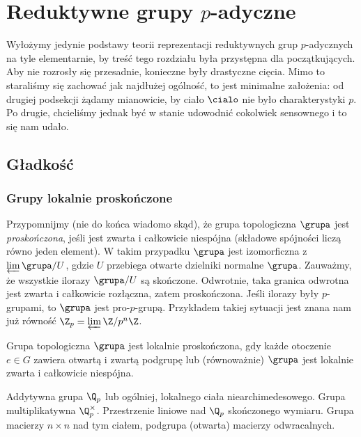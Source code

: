 \section{Reduktywne grupy $p$-adyczne}
Wyłożymy jedynie podstawy teorii reprezentacji reduktywnych grup $p$-adycznych na tyle elementarnie, by treść tego rozdziału była przystępna dla początkujących.
Aby nie rozrosły się przesadnie, konieczne były drastyczne cięcia.
Mimo to staraliśmy się zachować jak najdłużej ogólność, to jest minimalne założenia: od drugiej podsekcji żądamy mianowicie, by ciało $\cialo$ nie było charakterystyki $p$.
Po drugie, chcieliśmy jednak być w stanie udowodnić cokolwiek sensownego i to się nam udało.

\subsection{Gładkość}
\subsubsection{Grupy lokalnie proskończone}
Przypomnijmy (nie do końca wiadomo skąd), że grupa topologiczna $\grupa$ jest \emph{proskończona}, jeśli jest zwarta i całkowicie niespójna (składowe spójności liczą równo jeden element).
W takim przypadku $\grupa$ jest izomorficzna z $\varprojlim \grupa / U$, gdzie $U$ przebiega otwarte dzielniki normalne $\grupa$.
Zauważmy, że wszystkie ilorazy $\grupa / U$ są skończone.
Odwrotnie, taka granica odwrotna jest zwarta i całkowicie rozłączna, zatem proskończona.
Jeśli ilorazy były $p$-grupami, to $\grupa$ jest pro-$p$-grupą.
Przykładem takiej sytuacji jest znana nam już równość $\Z_p = \varprojlim \Z/p^n\Z$.

\begin{definicja}
	Grupa topologiczna $\grupa$ jest lokalnie proskończona, gdy każde otoczenie $e \in G$ zawiera otwartą i zwartą podgrupę lub (równoważnie) $\grupa$ jest lokalnie zwarta i całkowicie niespójna.
\end{definicja}

\begin{przyklad}
	Addytywna grupa $\Q_p$ lub ogólniej, lokalnego ciała niearchimedesowego.
	Grupa multiplikatywna $\Q_p^\times$.
	Przestrzenie liniowe nad $\Q_p$ skończonego wymiaru.
	Grupa macierzy $n \times n$ nad tym ciałem, podgrupa (otwarta) macierzy odwracalnych.
\end{przyklad}

